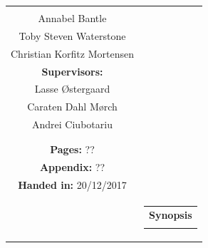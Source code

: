 \begin{titlepage}
\begin{nopagebreak}
{\begin{tabular}{cc}
{{\textbf{Students:}\\
Annabel Bantle \\
Toby Steven Waterstone\\
Christian Korfitz Mortensen\\


\textbf{Supervisors:}\\
Lasse Østergaard\\
Caraten Dahl Mørch\\
Andrei Ciubotariu
}\\
\\
\\
\textbf{Pages:} ??\\
\textbf{Appendix:} ?? \\
\textbf{Handed in:} 20/12/2017\\

\vfill } &
\parbox{7cm}{
  \vspace{.15cm}
  \hfill
  \begin{tabular}{l}
  {\textbf{Synopsis}}\bigskip \\
  \fbox{
    \parbox{6.5cm}{\bigskip
     {\vfill{\small 
     \bigskip}}
     }}
   \end{tabular}}
\end{tabular}} %



\end{nopagebreak}
\end{titlepage}
%